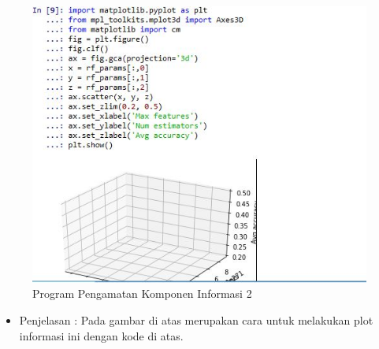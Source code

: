 \begin{enumerate}
\begin{itemize}
\begin{itemize}
\begin{itemize}
\par
\begin{figure}[ht]
\centering
\includegraphics[scale=0.7]{figures/cod30.jpg}
\caption{Program Pengamatan Komponen Informasi 2}
\label{contoh}
\end{figure}
\par
\begin{itemize}
\item Penjelasan : Pada gambar di atas merupakan cara untuk  melakukan plot informasi ini dengan kode di atas.
\par 
\par
\end{itemize}
\end{itemize}
\end{itemize}
\end{itemize}


\end{enumerate}
